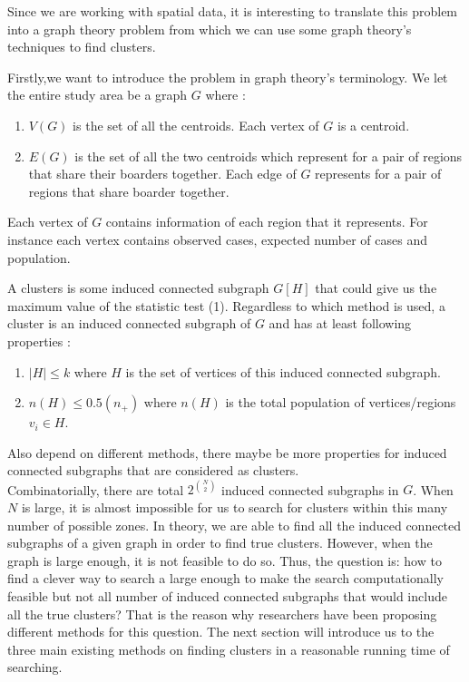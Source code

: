 \documentclass[12pt]{article}
\begin{document}
				Since we are working with spatial data, it is interesting to translate this problem into a graph theory problem from which we can use some graph theory's techniques to find clusters. 
				
				Firstly,we want to introduce the problem in graph theory's terminology. We let the entire study area be a graph $G$ where : \\
				\begin{enumerate}
					
				\item $V(G)$ is the set of all the centroids. Each vertex of $G$ is a centroid. \\
				\item $E(G)$ is the set of all the two centroids which represent for a pair of regions that share their boarders together. Each edge of $G$ represents for a pair of regions that share boarder together.\\
				\end{enumerate}
				
				Each vertex of $G$ contains information of each region that it represents. For instance  each vertex contains observed cases, expected number of cases and population.
				
				A clusters is some induced connected subgraph $G[H]$ that could give us the maximum value of the statistic test (1). Regardless to which method is used, a cluster is an induced connected subgraph of $G$ and has at least following properties : \\
				\begin{enumerate}
					
					\item $|H| \leq k $ where $H$ is the set of vertices of this induced connected subgraph.
					\item $n(H) \leq 0.5(n_+)$ where $n(H)$ is the total population of vertices/regions $v_i \in H$. 
				\end{enumerate}
				Also depend on different methods, there maybe be more properties for induced connected subgraphs that are considered as clusters.\\ 	
			
				Combinatorially, there are total $2^ {\binom{N}{2}}$ induced connected subgraphs in $G$. When $N$ is large, it is almost impossible for us to search for clusters within this many number of possible zones. In theory, we are able to find all the induced connected subgraphs of a given graph in order to find true clusters. However, when the graph is large enough, it is not feasible to do so. Thus, the question is: how to find a clever way to search a large enough to make the search computationally feasible but not all number of induced connected subgraphs that would include all the true clusters? That is the reason why researchers have been proposing different methods for this question. The next section will introduce us to the three main existing methods on finding clusters in a reasonable running time of searching.\\
			
\end{document}
